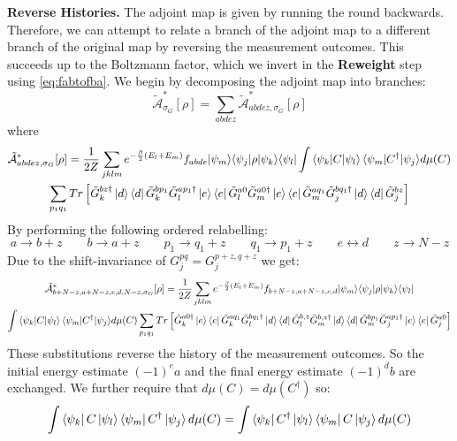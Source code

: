 \textbf{Reverse Histories.} The adjoint map is given by running the round backwards. Therefore, we can attempt to relate a branch of the adjoint map to a different branch  of the original map by reversing the measurement outcomes. This succeeds up to the Boltzmann factor, which we invert in the \textbf{Reweight} step using \eqref{eq:fabtofba}. We begin by decomposing the adjoint map into branches:
\begin{equation}
    \tilde{\mathcal{A}}^*_{\sigma_G}[\rho] =  \sum_{abdez}\tilde{\mathcal{A}}^*_{abdez,\sigma_G}[\rho]
\end{equation}
where 
\begin{multline}
  \tilde{\mathcal{A}}^*_{abdez,\sigma_G}[\rho] = \frac{1}{2Z} \sum_{jklm}  e^{-\frac{\beta}{2}(E_l+E_m)}{f_{abde}} {\ket{\psi_m}}{\bra{\psi_j}}\rho{\ket{\psi_k}}{\bra{\psi_l}} \int {\braket{\psi_k|C|\psi_l}\braket{\psi_m|C^{\dagger}|\psi_j}} d\mu(C)\\\sum_{p_1q_1}Tr\left[ {\tilde G^{bz\dagger}_k\ket{d}\bra{d}\tilde G^{bp_1}_k} {\tilde G_l^{ap_1\dagger}\ket{e}\bra{e}\tilde G_l^{a0}\tilde G_m^{a0\dagger}\ket{e}\bra{e}\tilde G_m^{aq_1}} {\tilde G^{bq_1\dagger}_j\ket{d}\bra{d}\tilde G^{bz}_j } \right]
\end{multline}
By performing the following ordered relabelling:
\begin{equation}
    a \rightarrow b+z \qquad b\rightarrow a+z \qquad p_1 \rightarrow q_1+ z \qquad q_1 \rightarrow p_1 + z \qquad e \leftrightarrow d \qquad z \rightarrow N-z
\end{equation}
Due to the shift-invariance of $G^{pq}_j = G^{p+z,q+z}_j$ we get:
\begin{multline}
  \tilde{\mathcal{A}}^*_{b+N-z,a+N-z,e,d,N-z,\sigma_G}[\rho] = \frac{1}{2Z} \sum_{jklm}  e^{-\frac{\beta}{2}(E_l+E_m)}{f_{b+N-z,a+N-z,e,d}} {\ket{\psi_m}}{\bra{\psi_j}}\rho{\ket{\psi_k}}{\bra{\psi_l}} \\\int {\braket{\psi_k|C|\psi_l}\braket{\psi_m|C^{\dagger}|\psi_j}} d\mu(C)\sum_{p_1q_1} Tr\left[{\tilde G^{a0\dagger}_k\ket{e}\bra{e}\tilde G^{aq_1}_k} {\tilde G_l^{bq_1\dagger}\ket{d}\bra{d}\tilde G_l^{b,z}\tilde G_m^{b, z\dagger}\ket{d}\bra{d}\tilde G_m^{bp_1}} {\tilde G^{ap_1\dagger}_j\ket{e}\bra{e}\tilde G^{a0}_j } \right]
\end{multline}
These substitutions reverse the history of the measurement outcomes. So the initial energy estimate $(-1)^ea$ and the final energy estimate $(-1)^db$ are exchanged. We further require that $d\mu(C) = d\mu(C^{\dagger})$ so:
\begin{equation}
    \int  \bra{\psi_k}C\ket{\psi_{l}}\bra{\psi_m}C^{\dagger} \ket{\psi_j} d\mu(C) = \int  \bra{\psi_k}C^{\dagger}\ket{\psi_{l}}\bra{\psi_m}C \ket{\psi_j} d\mu(C)
\end{equation}
